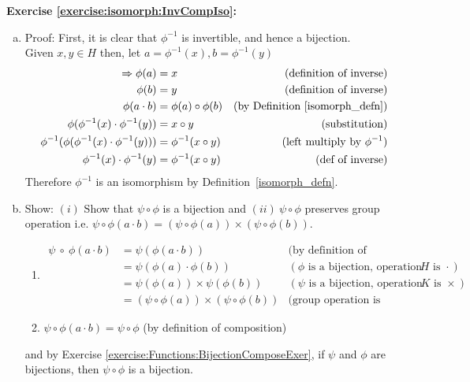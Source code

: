 \noindent\textbf{Exercise \ref{exercise:isomorph:InvCompIso}:}
\\
\begin{enumerate}[(a)]
\item
Proof:  First, it is clear that $\phi^{-1}$ is invertible, and hence a bijection.
\\
Given $x, y \in H$ then, let $a = \phi^{-1}(x), b = \phi^{-1}(y)$
\begin{align*}
\implies \phi(a) &= x &\text{(definition of inverse)}
\\
\phi(b) &= y &\text{(definition of inverse)}
\\
\phi(a \cdot b) &= \phi(a) \circ \phi(b) &\text{(by Definition~\ref{isomorph_defn})}
\\
\phi(\phi^{-1}(x) \cdot \phi^{-1}(y)) &= x \circ y &\text{(substitution)}
\\
\phi^{-1}(\phi(\phi^{-1}(x) \cdot \phi^{-1}(y))) &= \phi^{-1}(x \circ y) &\text{(left multiply by\ } \phi^{-1})
\\
\phi^{-1}(x) \cdot \phi^{-1}(y) &= \phi^{-1}(x \circ y) &\text{(def of inverse)}
\end{align*}
Therefore $\phi^{-1}$ is an isomorphism by Definition~\ref{isomorph_defn}.
\\

\item
Show: $(i)$ Show that $\psi \circ \phi$ is a bijection and $(ii)\ \psi \circ \phi$ preserves group operation i.e. $\psi \circ \phi(a \cdot b) = (\psi \circ \phi(a)) \times (\psi \circ \phi(b))$.
	\begin{enumerate}[($i$)]
	\item
	\begin{align*}
	\psi \ \circ \ \phi(a \cdot b) &= \psi(\phi(a \cdot b)) &\text{(by definition of composition)}
	\\
	&=\psi(\phi(a) \cdot \phi(b)) &(\phi \text{\ is a bijection, operation of\ } H \text{\ is\ } \cdot)
	\\
	&= \psi(\phi(a)) \times \psi(\phi(b)) &(\psi \text{\ is a bijection, operation of\ } K \text{\ is\ } \times)
	\\
	&= (\psi \circ \phi(a)) \times (\psi \circ \phi(b)) &\text{(group operation is preserved)}
	\end{align*}

	\item
	$\psi \circ \phi(a \cdot b) = \psi \circ \phi$ \quad (by definition of composition)
	\end{enumerate}
and by Exercise \ref{exercise:Functions:BijectionComposeExer}, if $\psi$ and $\phi$ are bijections, then $\psi \circ \phi$ is a bijection.
\end{enumerate}

